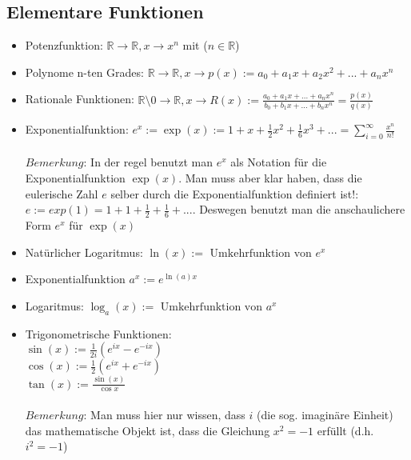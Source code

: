 \documentclass[11pt]{article} %
\begin{document}
\subsection{Elementare Funktionen}

\begin{itemize}
\item Potenzfunktion: $\mathbb{R} \rightarrow \mathbb{R}, x \rightarrow x^n$ mit ($n \in \mathbb{R}$)
\item Polynome n-ten Grades: $\mathbb{R} \rightarrow \mathbb{R}, x \rightarrow p(x):= a_0 + a_1x+a_2x^2 + ... + a_nx^n$
\item Rationale Funktionen: $\mathbb{R}\setminus{0} \rightarrow \mathbb{R}, x \rightarrow R(x) := \frac{a_0 + a_1x + ... +a_nx^n}{b_0 + b_1x + ... +b_nx^n} = \frac{p(x)}{q(x)}$
\item Exponentialfunktion: $e^x := \exp(x) := 1 + x +\frac{1}{2}x^2 + \frac{1}{6}x^3 +... = \sum_{i=0}^\infty \frac{x^n}{n!}$\\\\
$Bemerkung$: In der regel benutzt man $e^x$ als Notation für die Exponentialfunktion $\exp(x)$. Man muss aber klar haben, dass die eulerische Zahl $e$ selber durch die Exponentialfunktion definiert ist!: $e := exp(1) = 1+1+\frac{1}{2} + \frac{1}{6} + ...$. Deswegen benutzt man die anschaulichere Form $e^x$ für $\exp(x)$\\

\item Natürlicher Logaritmus: $\ln(x):= \textrm{ Umkehrfunktion von } e^x$
\item Exponentialfunktion $a^x := e^{\ln(a)x}$
\item Logaritmus: $\log_a(x) := \textrm{ Umkehrfunktion von } a^x$
\item Trigonometrische Funktionen:\\
 $\sin(x) := \frac{1}{2i}(e^{ix}-e^{-ix})$\\
 $\cos(x) := \frac{1}{2}(e^{ix}+e^{-ix})$\\
$\tan(x) :=\frac{\sin(x)}{\cos{x}}$\\\\
$Bemerkung$: Man muss hier nur wissen, dass $i$ (die sog. imaginäre Einheit) das mathematische Objekt ist, dass die Gleichung $x^2 = -1$ erfüllt (d.h. $i^2 = -1$)
\end{itemize}
\end{document}
